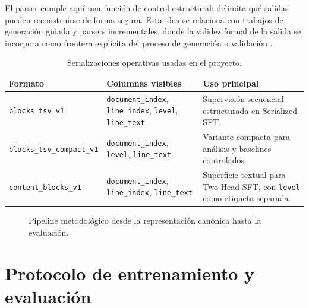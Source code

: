 El parser cumple aquí una función de control estructural: delimita qué salidas pueden reconstruirse de forma segura. Esta idea se relaciona con trabajos
de generación guiada y parsers incrementales, donde la validez formal de la salida se incorpora como frontera explícita del proceso de generación o
validación \citep{scholak2021picard, geng2023grammar, willard2023efficient}.

\begin{table}[htbp]
\centering
\caption{Serializaciones operativas usadas en el proyecto.}
\label{tab:ch4_serializations}
\begin{tabular}{p{}p{}p{}}
\toprule
\textbf{Formato} & \textbf{Columnas visibles} & \textbf{Uso principal} \\
\midrule
\texttt{blocks\_tsv\_v1} & \texttt{document\_index}, \texttt{line\_index}, \texttt{level}, \texttt{line\_text} & Supervisión secuencial estructurada en Serialized SFT. \\
\texttt{blocks\_tsv\_compact\_v1} & \texttt{document\_index}, \texttt{level}, \texttt{line\_text} & Variante compacta para análisis y baselines controlados. \\
\texttt{content\_blocks\_v1} & \texttt{document\_index}, \texttt{line\_index}, \texttt{line\_text} & Superficie textual para Two-Head SFT, con \texttt{level}
como etiqueta separada. \\
\bottomrule
\end{tabular}
\end{table}

\begin{figure}[htbp]
\centering
{}
\caption{Pipeline metodológico desde la representación canónica hasta la evaluación.}
\label{fig:ch4_pipeline_scheme}
\end{figure}

\section{Protocolo de entrenamiento y evaluación}
\label{sec:ch4_protocol}

